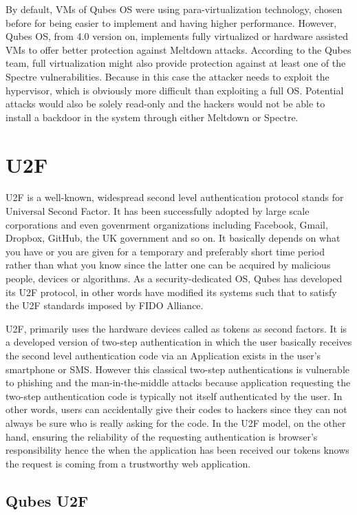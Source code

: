 \documentclass[runningheads,a4paper]{article}
\begin{document}
By default, VMs of Qubes OS
were using para-virtualization technology, chosen before for being
easier to implement and having higher performance. However, Qubes OS,
from 4.0 version on, implements fully virtualized or hardware assisted
VMs to offer better protection against Meltdown attacks. According to
the Qubes team, full virtualization might also provide protection
against at least one of the Spectre vulnerabilities. Because in this
case the attacker needs to exploit the hypervisor, which is obviously
more difficult than exploiting a full OS. Potential attacks would also
be solely read-only and the hackers would not be able to install a
backdoor in the system through either Meltdown or Spectre.

\section{U2F} 

U2F is a well-known, widespread second level
authentication protocol stands for Universal Second Factor. It has
been successfully adopted by large scale corporations and even
govenrment organizations including Facebook, Gmail, Dropbox, GitHub,
the UK government and so on. It basically depends on what you have or
you are given for a temporary and preferably short time period rather
than what you know since the latter one can be acquired by malicious
people, devices or algorithms. As a security-dedicated OS, Qubes has
developed its U2F protocol, in other words have modified its systems
such that to satisfy the U2F standards imposed by FIDO Alliance.

U2F, primarily uses the hardware devices called as tokens as second
factors. It is a developed version of two-step authentication in which
the user basically receives the second level authentication code via
an Application exists in the user's smartphone or SMS. However this
classical two-step authentications is vulnerable to phishing and the
man-in-the-middle attacks because application requesting the two-step
authentication code is typically not itself authenticated by the
user. In other words, users can accidentally give their codes to
hackers since they can not always be sure who is really asking for the
code. In the U2F model, on the other hand, ensuring the reliability of
the requesting authentication is browser's responsibility hence the
when the application has been received our tokens knows the request is
coming from a trustworthy web application.

\subsection{Qubes U2F} 
\end{document}
